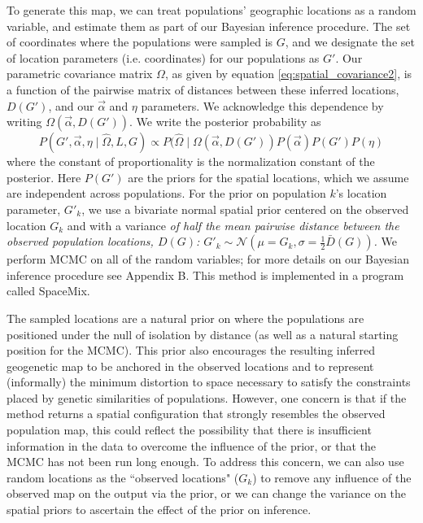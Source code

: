 \documentclass[12pt]{article}
\newcommand{\gb}[1]{{\em \color{magenta} #1}}
\begin{document}
To generate this map, we can treat populations' geographic locations as a random variable, and estimate them as part of our Bayesian inference procedure.  The set of coordinates where the populations were sampled is $G$, and we designate the set of location parameters (i.e. coordinates) for our populations as $G'$. Our parametric covariance matrix $\Omega$, as given by equation \eqref{eq:spatial_covariance2}, is a function of the pairwise matrix of distances between these inferred locations, $D(G')$, and our $\vec{\alpha}$ and $\eta$ parameters.  We acknowledge this dependence by writing $\Omega(\vec{\alpha},{D}(G'))$.  We write the  posterior probability as 
\begin{equation}
\label{eq:cyol_prob}
P(G', \vec{\alpha}, \eta \mid \widehat{\Omega}, L,G) \propto  P(\widehat{\Omega}  \mid \Omega(\vec{\alpha},{D}(G') ) P(\vec{\alpha}) P(G') P(\eta) 
\end{equation}
where the constant of proportionality is the normalization constant of the posterior. Here $P(G') $ are the priors for the spatial locations, which we assume are independent across populations. For the prior on population $k$'s location parameter, $G'_k$, we use a bivariate normal spatial prior centered on the observed location $G_k$ and with a variance \gb{of half the mean pairwise distance between the observed population locations, $D(G)$: $G'_k \sim \mathcal{N}(\mu = G_k,\sigma = \frac{1}{2}\bar{D}(G))$.} We perform MCMC on all of the random variables; for more details on our Bayesian inference procedure see Appendix B. This method is implemented in a program called SpaceMix.


The sampled locations are a natural prior on where the populations are positioned under the null of isolation by distance (as well as a natural starting position for the MCMC). This prior also encourages the resulting inferred geogenetic map to be anchored in the observed locations and to represent (informally) the minimum distortion to space necessary to satisfy the constraints placed by genetic similarities of populations. However, one concern is that if the method returns a spatial configuration that strongly resembles the observed population map, this could reflect the possibility that there is insufficient information in the data to overcome the influence of the prior, or that the MCMC has not been run long enough.  To address this concern, we can also use random locations as the ``observed locations" ($G_k$) to remove any influence of the observed map on the output via the prior, or we can change the variance on the spatial priors to ascertain the effect of the prior on inference.
\end{document}
